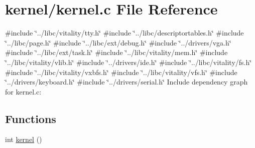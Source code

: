 \hypertarget{a00068}{}\section{kernel/kernel.c File Reference}
\label{a00068}
{\ttfamily \#include \char`\"{}../libc/vitality/tty.\+h\char`\"{}}\newline
{\ttfamily \#include \char`\"{}../libc/descriptortables.\+h\char`\"{}}\newline
{\ttfamily \#include \char`\"{}../libc/page.\+h\char`\"{}}\newline
{\ttfamily \#include \char`\"{}../libc/ext/debug.\+h\char`\"{}}\newline
{\ttfamily \#include \char`\"{}../drivers/vga.\+h\char`\"{}}\newline
{\ttfamily \#include \char`\"{}../libc/ext/task.\+h\char`\"{}}\newline
{\ttfamily \#include \char`\"{}../libc/vitality/mem.\+h\char`\"{}}\newline
{\ttfamily \#include \char`\"{}../libc/vitality/vlib.\+h\char`\"{}}\newline
{\ttfamily \#include \char`\"{}../drivers/ide.\+h\char`\"{}}\newline
{\ttfamily \#include \char`\"{}../libc/vitality/fs.\+h\char`\"{}}\newline
{\ttfamily \#include \char`\"{}../libc/vitality/vxbfs.\+h\char`\"{}}\newline
{\ttfamily \#include \char`\"{}../libc/vitality/vfs.\+h\char`\"{}}\newline
{\ttfamily \#include \char`\"{}../drivers/keyboard.\+h\char`\"{}}\newline
{\ttfamily \#include \char`\"{}../drivers/serial.\+h\char`\"{}}\newline
Include dependency graph for kernel.\+c\+:
\subsection*{Functions}
\begin{DoxyCompactItemize}
\item 
int \hyperlink{a00068_a4ee3d1f05046b7afc6b4d516bf10667a_a4ee3d1f05046b7afc6b4d516bf10667a}{kernel} ()
\end{DoxyCompactItemize}
